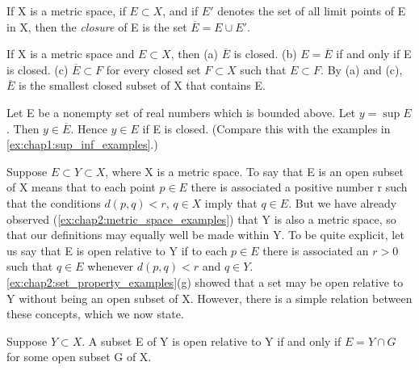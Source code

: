 \begin{definition} %
  \label{def:chap2:closure}
  If X is a metric space, if $E \subset X$, and if $E'$ denotes the
  set of all limit points of E in X, then the \emph{closure} of E is
  the set $\overline{E} = E \cup E'$.
\end{definition}

\begin{theorem} %
  \label{thm:chap2:closure_properties}
  If X is a metric space and $E \subset X$, then
  (a) $\overline{E}$ is closed.
  (b) $E = \overline{E}$ if and only if E is closed.
  (c) $\overline{E} \subset F$ for every closed set $F \subset X$
  such that $E \subset F$.
  By (a) and (c), $\overline{E}$ is the smallest closed subset of X
  that contains E.
\end{theorem}

\begin{theorem} %
  \label{thm:chap2:sup_in_closure}
  Let E be a nonempty set of real numbers which is bounded above. Let
  $y = \sup E$. Then $y \in \overline{E}$. Hence $y \in E$ if E is closed.
  (Compare this with the examples in \autoref{ex:chap1:sup_inf_examples}.)
\end{theorem}

\begin{remark} %
  \label{rem:chap2:relative_topology}
  Suppose $E \subset Y \subset X$, where X is a metric space. To say
  that E is an open subset of X means that to each point $p \in E$
  there is associated a positive number r such that the conditions
  $d(p, q) < r$, $q \in X$ imply that $q \in E$. But we have already
  observed (\autoref{ex:chap2:metric_space_examples}) that Y is also
  a metric space, so that our definitions may equally well be made
  within Y. To be quite explicit, let us say that E is open relative
  to Y if to each $p \in E$ there is associated an $r>0$ such that $q
  \in E$ whenever $d(p, q) < r$ and $q \in Y$.
  \autoref{ex:chap2:set_property_examples}(g) showed that a set may
  be open relative to Y without being an open subset of X. However,
  there is a simple relation between these concepts, which we now state.
\end{remark}

\begin{theorem} %
  \label{thm:chap2:relatively_open}
  Suppose $Y \subset X$. A subset E of Y is open relative to Y if and
  only if $E = Y \cap G$ for some open subset G of X.
\end{theorem}

